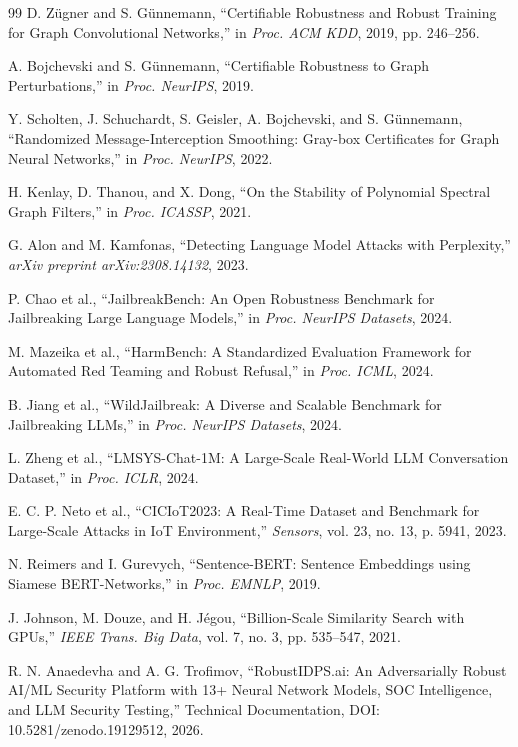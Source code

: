 \documentclass[journal]{IEEEtran}
\theoremstyle{plain}
\theoremstyle{definition}
\theoremstyle{remark}
\begin{document}
\begin{thebibliography}{99}
D. Z{\"u}gner and S. G{\"u}nnemann, ``Certifiable Robustness and Robust Training for Graph Convolutional Networks,'' in \textit{Proc. ACM KDD}, 2019, pp. 246--256.

A. Bojchevski and S. G{\"u}nnemann, ``Certifiable Robustness to Graph Perturbations,'' in \textit{Proc. NeurIPS}, 2019.

Y. Scholten, J. Schuchardt, S. Geisler, A. Bojchevski, and S. G{\"u}nnemann, ``Randomized Message-Interception Smoothing: Gray-box Certificates for Graph Neural Networks,'' in \textit{Proc. NeurIPS}, 2022.

H. Kenlay, D. Thanou, and X. Dong, ``On the Stability of Polynomial Spectral Graph Filters,'' in \textit{Proc. ICASSP}, 2021.

G. Alon and M. Kamfonas, ``Detecting Language Model Attacks with Perplexity,'' \textit{arXiv preprint arXiv:2308.14132}, 2023.

P. Chao et al., ``JailbreakBench: An Open Robustness Benchmark for Jailbreaking Large Language Models,'' in \textit{Proc. NeurIPS Datasets}, 2024.

M. Mazeika et al., ``HarmBench: A Standardized Evaluation Framework for Automated Red Teaming and Robust Refusal,'' in \textit{Proc. ICML}, 2024.

B. Jiang et al., ``WildJailbreak: A Diverse and Scalable Benchmark for Jailbreaking LLMs,'' in \textit{Proc. NeurIPS Datasets}, 2024.

L. Zheng et al., ``LMSYS-Chat-1M: A Large-Scale Real-World LLM Conversation Dataset,'' in \textit{Proc. ICLR}, 2024.

E. C. P. Neto et al., ``CICIoT2023: A Real-Time Dataset and Benchmark for Large-Scale Attacks in IoT Environment,'' \textit{Sensors}, vol. 23, no. 13, p. 5941, 2023.

N. Reimers and I. Gurevych, ``Sentence-BERT: Sentence Embeddings using Siamese BERT-Networks,'' in \textit{Proc. EMNLP}, 2019.

J. Johnson, M. Douze, and H. J\'{e}gou, ``Billion-Scale Similarity Search with GPUs,'' \textit{IEEE Trans. Big Data}, vol. 7, no. 3, pp. 535--547, 2021.

R. N. Anaedevha and A. G. Trofimov, ``RobustIDPS.ai: An Adversarially Robust AI/ML Security Platform with 13+ Neural Network Models, SOC Intelligence, and LLM Security Testing,'' Technical Documentation, DOI: 10.5281/zenodo.19129512, 2026.

\end{thebibliography}
\end{document}
